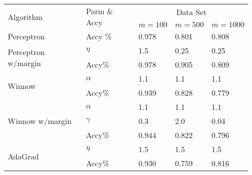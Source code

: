       \begin{center}
  \begin{table}
    \begin{tabular}{|p{4.3cm}<{\centering}|p{2.5cm}<{\centering}|p{2.7cm}<{\centering}|p{2.7cm}<{\centering}|p{2.7cm}<{\centering}|}
      \hline
      \multirow{2}{*}{Algorithm} & \multirow{2}{*}{Parm \& Accy} & \multicolumn{3}{|c|}{Data Set} \\
      \cline{3-5}
 & & $m=100$& $m=500$& $m=1000$\\
 \hline
      Perceptron    & Accy \%               &0.978                             &0.801   &0.808                               \\ \hline
      \multirow{2}{*}{Perceptron w/margin} &          $\eta$          &1.5                   &0.25     &0.25                              \\
      \cline{2-5}
      & Accy\% &0.978  &0.905 &0.809 \\ \hline \hline
      \multirow{2}{*}{Winnow}               &     $\alpha$           &1.1                     &1.1         &1.1                           \\
      \cline{2-5}
      & Accy\% &0.939  &0.828 & 0.779\\ \hline \hline
      \multirow{3}{*}{Winnow w/margin}     & $\alpha$&1.1                                     &1.1     &1.1                \\
      \cline{2-5}
      & $\gamma$ &0.3  &2.0 & 0.04\\
      \cline{2-5}
      & Accy\% &0.944  &0.822 & 0.796\\ \hline \hline
      \multirow{2}{*}{AdaGrad}             & $\eta$&1.5                                      &1.5               &1.5                     \\
      \cline{2-5}
      & Accy\% &0.930  &0.759 & 0.816\\ \hline %
    \end{tabular}
    \end{table}
    \end{center}


